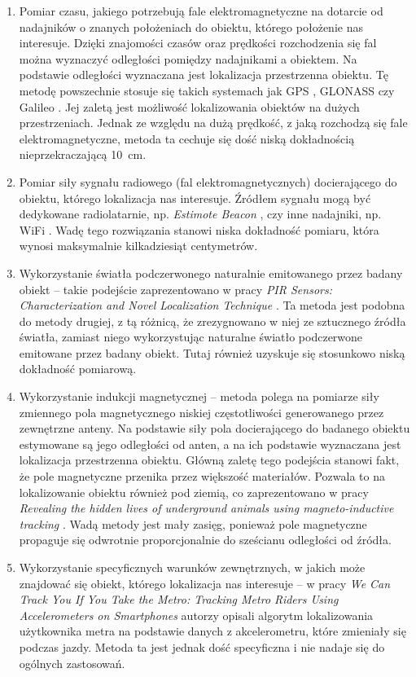 \begin{enumerate}
 \item
 Pomiar czasu, jakiego potrzebują fale elektromagnetyczne na dotarcie od nadajników o znanych położeniach 
 do obiektu, którego położenie nas interesuje.
 Dzięki znajomości czasów oraz prędkości rozchodzenia się fal można wyznaczyć odległości pomiędzy nadajnikami a obiektem.
 Na podstawie odległości wyznaczana jest lokalizacja przestrzenna obiektu. 
 Tę metodę powszechnie stosuje się takich systemach jak GPS \cite{bib:gps}, GLONASS \cite{bib:GLONASS} czy Galileo \cite{bib:galileo}.
 Jej zaletą jest możliwość lokalizowania obiektów na dużych przestrzeniach.
 Jednak ze względu na dużą prędkość, z jaką rozchodzą się fale elektromagnetyczne, metoda ta cechuje się dość niską 
 dokładnością nieprzekraczającą \SI{10}{cm}.
 
 \item
 Pomiar siły sygnału radiowego (fal elektromagnetycznych) docierającego do obiektu, którego lokalizacja nas interesuje.
 Źródłem sygnału mogą być dedykowane radiolatarnie, np. \textit{Estimote Beacon} \cite{bib:beacon},
 czy inne nadajniki, np. WiFi \cite{bib:lokWiFi}.
 Wadę tego rozwiązania stanowi niska dokładność pomiaru, która wynosi maksymalnie kilkadziesiąt centymetrów.  
 
 \item
 Wykorzystanie światła podczerwonego naturalnie emitowanego przez badany obiekt --
 takie podejście zaprezentowano w pracy \textit{PIR Sensors: Characterization and Novel Localization Technique}
 \cite{bib:PIRsens}. Ta metoda jest podobna do metody drugiej, z tą różnicą, że zrezygnowano w niej
 ze sztucznego źródła światła, zamiast niego wykorzystując naturalne światło podczerwone emitowane 
 przez badany obiekt. Tutaj również uzyskuje się stosunkowo niską dokładność pomiarową.
 
 \item
 Wykorzystanie indukcji magnetycznej --  metoda polega na pomiarze siły zmiennego pola magnetycznego niskiej częstotliwości
 generowanego przez zewnętrzne anteny. Na podstawie siły pola docierającego do badanego obiektu estymowane są jego odległości
 od anten, a na ich podstawie wyznaczana jest lokalizacja przestrzenna obiektu.
 Główną zaletę tego podejścia stanowi fakt, że pole magnetyczne przenika przez większość materiałów. Pozwala  
 to na lokalizowanie obiektu również pod ziemią, co zaprezentowano w pracy
 \textit{Revealing the hidden lives of underground animals using magneto-inductive tracking} \cite{bib:chomiki}. 
 Wadą metody jest mały zasięg, ponieważ pole magnetyczne propaguje się odwrotnie proporcjonalnie do sześcianu  
 odległości od źródła.
 
 \item 
 Wykorzystanie specyficznych warunków zewnętrznych, w jakich może znajdować się obiekt, którego lokalizacja nas interesuje
 -- w pracy \textit{We Can Track You If You Take the Metro: Tracking Metro
Riders Using Accelerometers on Smartphones} \cite{bib:metro} autorzy opisali algorytm lokalizowania
użytkownika metra na podstawie danych z akcelerometru, które zmieniały się podczas jazdy.
Metoda ta jest jednak dość specyficzna i nie nadaje się do ogólnych zastosowań. 
 
\end{enumerate}
